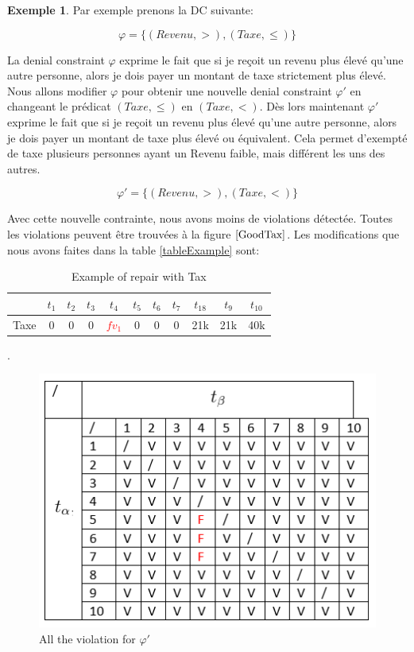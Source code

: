 \documentclass[letterpaper, 12pt]{report}
\theoremstyle{definition}
\newtheorem{myexample}{Exemple}
\begin{document}
\begin{myexample}
Par exemple prenons la DC suivante:

$$ \varphi = \{(Revenu,>),(Taxe,\leq) \} $$

La denial constraint $\varphi$ exprime le fait que si je reçoit un revenu plus élevé qu'une autre personne, alors je dois payer un montant de taxe strictement plus élevé. Nous allons modifier $\varphi$ pour obtenir une nouvelle denial constraint $\varphi'$ en changeant le prédicat $(Taxe,\leq)$ en $(Taxe,<)$. Dès lors maintenant $\varphi'$ exprime le fait que si je reçoit un revenu plus élevé qu'une autre personne, alors je dois payer un montant de taxe plus élevé ou équivalent. Cela permet d'exempté de taxe plusieurs personnes ayant un Revenu faible, mais différent les uns des autres. 

$$ \varphi' = \{(Revenu,>),(Taxe,<) \} $$

Avec cette nouvelle contrainte, nous avons moins de violations détectée. Toutes les violations peuvent être trouvées à la figure $\ref{GoodTax}$. Les modifications que nous avons faites dans la table \ref{tableExample} sont:

\begin{table}[H]
	\centering
	\begin{tabular}{|c|c c c c c c c c c c|}
	\hline
	   & $t_1$ & $t_2$ & $t_3$ &$t_4$ &$t_5$ &$t_6$ &$t_7$ &$t_18$ &$t_9$ &$t_10$ \\
	\hline
	 Taxe & 0 & 0 & 0 & \textcolor{red}{$fv_1$} & 0 & 0 & 0 & 21k & 21k & 40k\\
	 \hline
	\end{tabular}
	\caption{\label{tableExample2} Example of repair with Tax}.
\end{table}


\begin{figure}
	\centering
	\includegraphics[scale=1]{img/TaxGood}
	\caption{\label{GoodTax} All the violation for $\varphi '$}
\end{figure}


\end{myexample}
\end{document}
